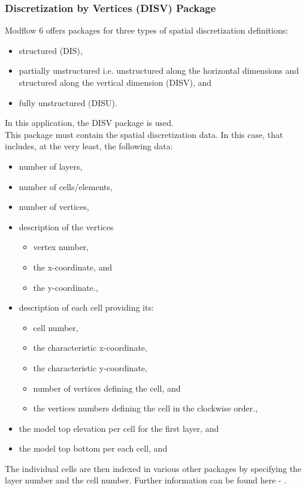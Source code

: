 \subsubsection*{Discretization by Vertices (DISV) Package}
Modflow 6 offers packages for three types of spatial discretization definitions:
\begin{itemize}
    \item structured (DIS),
    \item partially unstructured i.e. unstructured along the horizontal dimensions and structured along the vertical dimension (DISV), and
    \item fully unstructured (DISU).
\end{itemize}
In this application, the DISV package is used.
\\
This package must contain the spatial discretization data. In this case, that includes, at the very least, the following data:
\begin{itemize}
    \item number of layers,
    \item number of cells/elements,
    \item number of vertices,
    \item description of the vertices
    \begin{itemize}
        \item vertex number,
        \item the x-coordinate, and
        \item the y-coordinate.,
    \end{itemize}
    \item description of each cell providing its:
    \begin{itemize}
        \item cell number,
        \item the characteristic x-coordinate,
        \item the characteristic y-coordinate,
        \item number of vertices defining the cell, and
        \item the vertices numbers defining the cell in the clockwise order.,
    \end{itemize}
    \item the model top elevation per cell for the first layer, and
    \item the model top bottom per each cell, and
\end{itemize}
The individual cells are then indexed in various other packages by specifying the layer number and the cell number.
Further information can be found here - \cite[p.~29]{USGS2018}.

